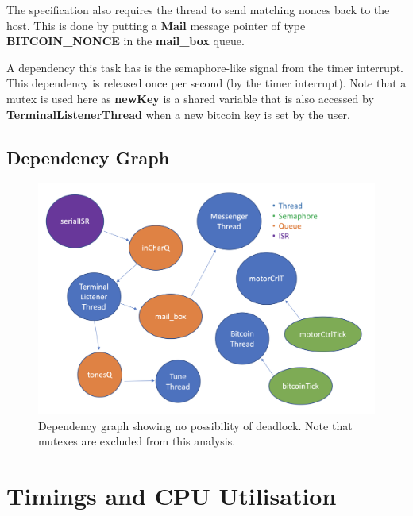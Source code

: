 \documentclass{article}
\begin{document}
\bigskip

\noindent
The specification also requires the thread to send matching nonces back to the host. This is done by putting a \textbf{Mail} message pointer of type \textbf{BITCOIN\_NONCE} in the \textbf{mail\_box} queue.

\bigskip



\bigskip

\noindent
A dependency this task has is the semaphore-like signal from the timer interrupt. This dependency is released once per second (by the timer interrupt). Note that a mutex is used here as \textbf{newKey} is a shared variable that is also accessed by \textbf{TerminalListenerThread} when a new bitcoin key is set by the user.


\subsection{Dependency Graph}

\begin{figure}[H]
\begin{center}
   \includegraphics[width=0.9\linewidth]{dependency.png}
\end{center}
   \caption{Dependency graph showing no possibility of deadlock. Note that mutexes are excluded from this analysis.}
\label{fig:long}
\label{fig:onecol}
\end{figure}

\section{Timings and CPU Utilisation}
\end{document}
